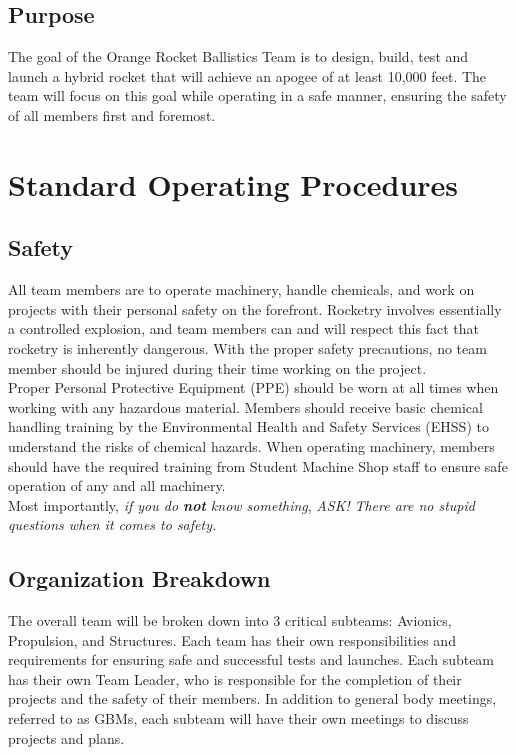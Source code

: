 \documentclass[12pt,article]{memoir}
\begin{document}
\section{Purpose}
The goal of the Orange Rocket Ballistics Team is to design, build, test and launch a hybrid rocket that will achieve an apogee of at least 10,000 feet. The team will focus on this goal while operating in a safe manner, ensuring the safety of all members first and foremost. 

\newpage
\chapter{Standard Operating Procedures}
\section{Safety}
All team members are to operate machinery, handle chemicals, and work on projects with their personal safety on the forefront. Rocketry involves essentially a controlled explosion, and team members can and will respect this fact that rocketry is inherently dangerous. With the proper safety precautions, no team member should be injured during their time working on the project.
\\
Proper Personal Protective Equipment (PPE) should be worn at all times when working with any hazardous material. Members should receive basic chemical handling training by the Environmental Health and Safety Services (EHSS) to understand the risks of chemical hazards. When operating machinery, members should have the required training from Student Machine Shop staff to ensure safe operation of any and all machinery. 
\\
Most importantly, \textit{if you do \textbf{not} know something}, \textit{ASK!} \textit{There are no stupid questions when it comes to safety.}

\section{Organization Breakdown}

The overall team will be broken down into 3 critical subteams: Avionics, Propulsion, and Structures. Each team has their own responsibilities and requirements for ensuring safe and successful tests and launches. Each subteam has their own Team Leader, who is responsible for the completion of their projects and the safety of their members. In addition to general body meetings, referred to as GBMs, each subteam will have their own meetings to discuss projects and plans.
\end{document}

